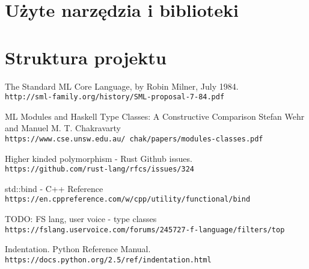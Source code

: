 \documentclass[declaration,shortabstract]{iithesis}
\begin{document}
\section{Użyte narzędzia i biblioteki}

\section{Struktura projektu}


\begin{thebibliography}{1}

The Standard ML Core Language, by Robin Milner, July 1984.
\\\texttt{http://sml-family.org/history/SML-proposal-7-84.pdf}

ML Modules and Haskell Type Classes:
A Constructive Comparison
Stefan Wehr and Manuel M. T. Chakravarty
\\\texttt{https://www.cse.unsw.edu.au/~chak/papers/modules-classes.pdf}

Higher kinded polymorphism - Rust Github issues.
\\\texttt{https://github.com/rust-lang/rfcs/issues/324}

std::bind - C++ Reference
\\\texttt{https://en.cppreference.com/w/cpp/utility/functional/bind}

TODO: FS lang, user voice - type classes
\\\texttt{https://fslang.uservoice.com/forums/245727-f-language/filters/top}

Indentation. Python Reference Manual.
\\\texttt{https://docs.python.org/2.5/ref/indentation.html}

\end{thebibliography}
\end{document}

